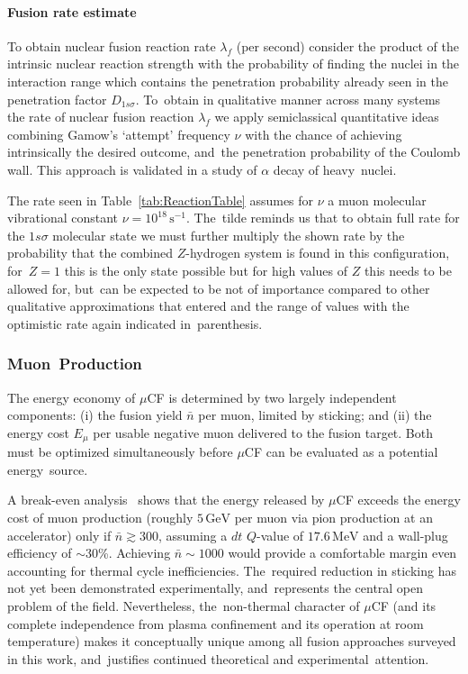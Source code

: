 \documentclass[particles,article,accept,pdftex,moreauthors]{Definitions/mdpi}
\begin{document}
\vspace{-6pt}\paragraph*{\bf Fusion rate estimate}
To obtain nuclear fusion reaction rate $\lambda_f$ (per second) consider the product of the intrinsic nuclear reaction strength with the probability of finding the nuclei in the interaction range which contains the penetration probability already seen in the penetration factor $D_{1s\sigma}$. To~obtain in qualitative manner across many systems the rate of nuclear fusion reaction $\lambda_f$ we apply semiclassical quantitative ideas combining Gamow's `attempt' frequency $\nu$ with the chance of achieving intrinsically the desired outcome, and~the penetration probability of the Coulomb wall. This approach is validated in a study of $\alpha$ decay of heavy~nuclei.

The rate seen in Table~\ref{tab:ReactionTable} assumes for $\nu$ a muon molecular vibrational constant \mbox{$\nu= 10^{18}\,\mathrm{s}^{-1}$.} The~tilde reminds us that to obtain full rate for the $1s\sigma$ molecular state we must further multiply the shown rate by the probability that the combined $Z$-hydrogen system is found in this configuration, for~$Z=1$ this is the only state possible but for high values of $Z$ this needs to be allowed for, but~can be expected to be not of importance compared to other qualitative approximations that entered and the range of values with the optimistic rate again indicated in~parenthesis.



\subsubsection{Muon~Production}\label{sssec:muon_production}
The energy economy of $\mu$CF is determined by two largely independent components: (i) the fusion yield $\bar{n}$ per muon, limited by sticking; and (ii) the energy cost $E_\mu$ per usable negative muon delivered to the fusion target. Both must be optimized simultaneously before $\mu$CF can be evaluated as a potential energy~source.

A break-even analysis~\cite{Rafelski:1990in} shows that the energy released by $\mu$CF exceeds the energy cost of muon production (roughly $5\,\mathrm{GeV}$ per muon via pion production at an accelerator) only if $\bar{n} \gtrsim 300$, assuming a $dt$ $Q$-value of $17.6\,\mathrm{MeV}$ and a wall-plug efficiency of $\sim$30\%. Achieving $\bar{n}\sim 1000$ would provide a comfortable margin even accounting for thermal cycle inefficiencies. The~required reduction in sticking has not yet been demonstrated experimentally, and~represents the central open problem of the field. Nevertheless, the~non-thermal character of $\mu$CF (and its complete independence from plasma confinement and its operation at room temperature) makes it conceptually unique among all fusion approaches surveyed in this work, and~justifies continued theoretical and experimental~attention.
\end{document}
